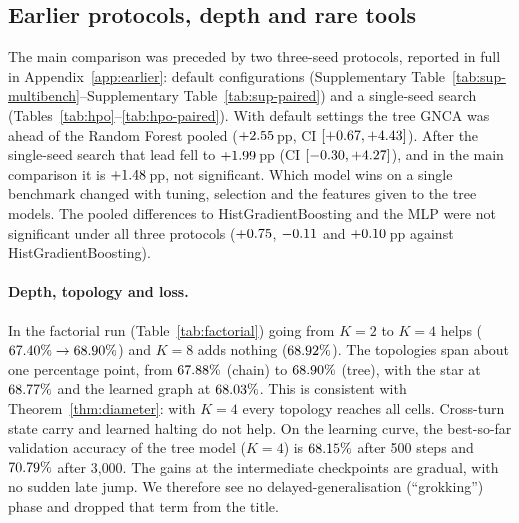 \documentclass[10pt]{article}
\begin{document}
\subsection{Earlier protocols, depth and rare tools}\label{sec:default-results}

The main comparison was preceded by two three-seed protocols, reported in full in Appendix~\ref{app:earlier}: default configurations (Supplementary Table~\ref{tab:sup-multibench}--Supplementary Table~\ref{tab:sup-paired}) and a single-seed search (Tables~\ref{tab:hpo}--\ref{tab:hpo-paired}). With default settings the tree GNCA was ahead of the Random Forest pooled ($+2.55$\,pp, CI $[+0.67, +4.43]$). After the single-seed search that lead fell to $+1.99$\,pp (CI $[-0.30, +4.27]$), and in the main comparison it is $+1.48$\,pp, not significant. Which model wins on a single benchmark changed with tuning, selection and the features given to the tree models. The pooled differences to HistGradientBoosting and the MLP were not significant under all three protocols ($+0.75$, $-0.11$ and $+0.10$\,pp against HistGradientBoosting).

\begin{table}[t]
\centering
\scriptsize
\setlength{\tabcolsep}{3pt}
\caption{Hermes factorial (test top-1, \%, mean $\pm$ SD over 3 seeds; source S2). Columns: training loss, label smoothing (LS) or class weights (CW). Carry: hidden state carried across turns; halting: learned halting. Contractive variant: spectrally normalised $W_1,W_2$, update $0.25\,\sigma(g)\odot\tanh(\delta)$.}
\label{tab:factorial}

\end{table}

\paragraph{Depth, topology and loss.} In the factorial run (Table~\ref{tab:factorial}) going from $K{=}2$ to $K{=}4$ helps ($67.40\%\to68.90\%$) and $K{=}8$ adds nothing ($68.92\%$). The topologies span about one percentage point, from $67.88\%$ (chain) to $68.90\%$ (tree), with the star at $68.77\%$ and the learned graph at $68.03\%$. This is consistent with Theorem~\ref{thm:diameter}: with $K{=}4$ every topology reaches all cells. Cross-turn state carry and learned halting do not help. On the learning curve, the best-so-far validation accuracy of the tree model ($K{=}4$) is $68.15\%$ after 500 steps and $70.79\%$ after 3{,}000. The gains at the intermediate checkpoints are gradual, with no sudden late jump. We therefore see no delayed-generalisation (``grokking'') phase and dropped that term from the title.
\end{document}
